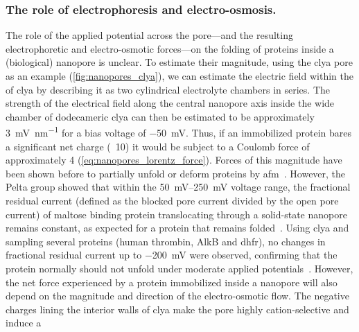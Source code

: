 \subsubsection{The role of electrophoresis and electro-osmosis.}
%

The role of the applied potential across the pore---and the resulting electrophoretic and electro-osmotic
forces---on the folding of proteins inside a (biological) nanopore is unclear. To estimate their magnitude,
using the \gls{clya} pore as an example (\cref{fig:nanopores_clya}), we can estimate the electric field within
the \lumen{} of \gls{clya} by describing it as two cylindrical electrolyte chambers in series. The strength of
the electrical field along the central nanopore axis inside the wide \cisi{} chamber of dodecameric \gls{clya}
can then be estimated to be approximately \SI{3}{\mV\per\nm} for a bias voltage of
\SI{-50}{\mV}.\footnotemark%
%
%
Thus, if an immobilized protein bares a significant net charge (\eg~\SI{10}{\ec}) it would be subject to a
Coulomb force of approximately \SI{4}{\pN} (\cref{eq:nanopores_lorentz_force}). Forces of this magnitude have
been shown before to partially unfold or deform proteins by \gls{afm}~\cite{Best-2001}. However, the Pelta
group showed that within the \SIrange{50}{250}{\mV} voltage range, the fractional residual current (defined as
the blocked pore current divided by the open pore current) of maltose binding protein translocating through a
solid-state nanopore remains constant, as expected for a protein that remains folded~\cite{Talaga-2009}. Using
\gls{clya} and sampling several proteins (human thrombin, {AlkB} and \gls{dhfr}), no changes in fractional
residual current up to \SI{-200}{\mV} were observed, confirming that the protein normally should not unfold
under moderate applied potentials~\cite{Soskine-2013}. However, the net force experienced by a protein
immobilized inside a nanopore will also depend on the magnitude and direction of the electro-osmotic flow. The
negative charges lining the interior walls of \gls{clya} make the pore highly cation-selective and induce a
